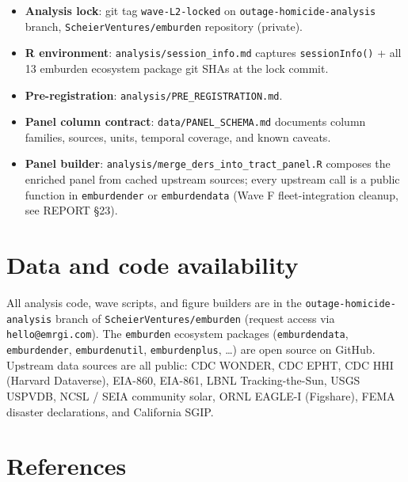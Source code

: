 \documentclass[
]{article}
\providecommand{\tightlist}{%
  \setlength{\itemsep}{0pt}\setlength{\parskip}{0pt}}
\begin{document}
\begin{itemize}
\tightlist
\item
  \textbf{Analysis lock}: git tag \texttt{wave-L2-locked} on
  \texttt{outage-homicide-analysis} branch,
  \texttt{ScheierVentures/emburden} repository (private).
\item
  \textbf{R environment}: \texttt{analysis/session\_info.md} captures
  \texttt{sessionInfo()} + all 13 emburden ecosystem package git SHAs at
  the lock commit.
\item
  \textbf{Pre-registration}: \texttt{analysis/PRE\_REGISTRATION.md}.
\item
  \textbf{Panel column contract}: \texttt{data/PANEL\_SCHEMA.md}
  documents column families, sources, units, temporal coverage, and
  known caveats.
\item
  \textbf{Panel builder}:
  \texttt{analysis/merge\_ders\_into\_tract\_panel.R} composes the
  enriched panel from cached upstream sources; every upstream call is a
  public function in \texttt{emburdender} or \texttt{emburdendata} (Wave
  F fleet-integration cleanup, see REPORT §23).
\end{itemize}

\hypertarget{data-and-code-availability}{%
\section{Data and code availability}\label{data-and-code-availability}}

All analysis code, wave scripts, and figure builders are in the
\texttt{outage-homicide-analysis} branch of
\texttt{ScheierVentures/emburden} (request access via
\texttt{hello@emrgi.com}). The \texttt{emburden} ecosystem packages
(\texttt{emburdendata}, \texttt{emburdender}, \texttt{emburdenutil},
\texttt{emburdenplus}, \ldots) are open source on GitHub. Upstream data
sources are all public: CDC WONDER, CDC EPHT, CDC HHI (Harvard
Dataverse), EIA-860, EIA-861, LBNL Tracking-the-Sun, USGS USPVDB, NCSL /
SEIA community solar, ORNL EAGLE-I (Figshare), FEMA disaster
declarations, and California SGIP.

\hypertarget{references}{%
\section{References}\label{references}}
\end{document}
